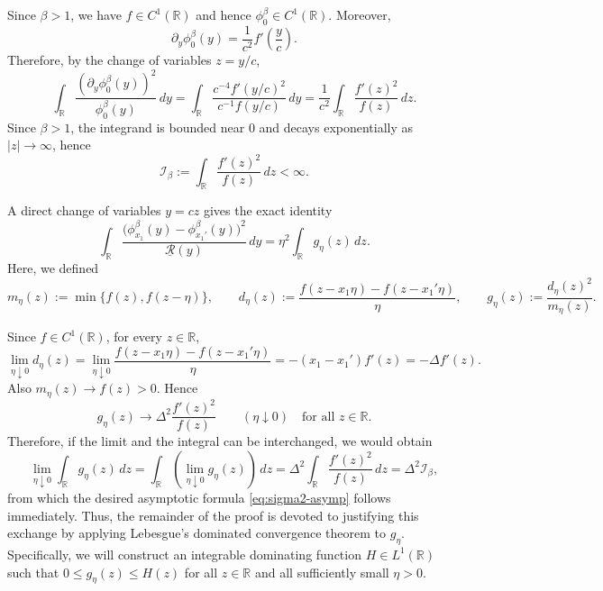 \documentclass{article}
\theoremstyle{plain}
\theoremstyle{definition}
\begin{document}
Since $\beta>1$, we have $f\in C^1(\mathbb R)$ and hence $\phi_0^\beta\in C^1(\mathbb R)$.
Moreover,
\[
\partial_y\phi_0^\beta(y)=\frac1{c^2}f'\!\left(\frac{y}{c}\right).
\]
Therefore, by the change of variables $z=y/c$,
\begin{equation}\label{eq:fisher-scale-eta}
\int_{\mathbb R}\frac{(\partial_y\phi_0^\beta(y))^2}{\phi_0^\beta(y)}\,dy
=\int_{\mathbb R}\frac{c^{-4}f'(y/c)^2}{c^{-1}f(y/c)}\,dy
=\frac1{c^2}\int_{\mathbb R}\frac{f'(z)^2}{f(z)}\,dz.
\end{equation}
Since $\beta>1$, the integrand is bounded near $0$ and decays exponentially as $|z|\to\infty$, hence
\begin{equation}\label{eq:Ibeta-eta}
\mathcal I_\beta:=\int_{\mathbb R}\frac{f'(z)^2}{f(z)}\,dz<\infty.
\end{equation}


A direct change of variables $y=cz$ gives the exact identity
\begin{equation}\label{eq:chi2-scale-eta}
\int_{\mathbb R}\frac{\bigl(\phi_{x_1}^\beta(y)-\phi_{x_1'}^\beta(y)\bigr)^2}{\underline{\mathcal R}(y)}\,dy
=\eta^2\int_{\mathbb R} g_\eta(z)\,dz.
\end{equation}
Here, we defined
\[
m_\eta(z):=\min\{f(z),f(z-\eta)\},\qquad
d_\eta(z):=\frac{f(z-x_1\eta)-f(z-x_1'\eta)}{\eta},
\qquad
g_\eta(z):=\frac{d_\eta(z)^2}{m_\eta(z)}.
\]


Since $f\in C^1(\mathbb R)$, for every $z\in\mathbb R$,
\[
\lim_{\eta\downarrow 0} d_\eta(z)
=\lim_{\eta\downarrow 0}\frac{f(z-x_1\eta)-f(z-x_1'\eta)}{\eta}
=-(x_1-x_1')f'(z)=-\Delta f'(z).
\]
Also $m_\eta(z)\to f(z)>0$. Hence
\begin{equation}\label{eq:g-pointwise-eta}
g_\eta(z)\to \Delta^2\frac{f'(z)^2}{f(z)}
\qquad(\eta\downarrow 0)\quad\text{for all }z\in\mathbb R.
\end{equation}
Therefore, if the limit and the integral can be interchanged, we would obtain
\[
\lim_{\eta \downarrow 0} \int_{\mathbb R} g_\eta(z) \, dz
= \int_{\mathbb R} \left( \lim_{\eta \downarrow 0} g_\eta(z) \right) \, dz
= \Delta^2 \int_{\mathbb R} \frac{f'(z)^2}{f(z)} \, dz
= \Delta^2 \mathcal{I}_\beta,
\]
from which the desired asymptotic formula \eqref{eq:sigma2-asymp} follows immediately.
Thus, the remainder of the proof is devoted to justifying this exchange by applying Lebesgue's dominated convergence theorem to $g_\eta$. Specifically, we will construct an integrable dominating function $H \in L^1(\mathbb R)$ such that $0 \le g_\eta(z) \le H(z)$ for all $z \in \mathbb R$ and all sufficiently small $\eta > 0$.
\end{document}
